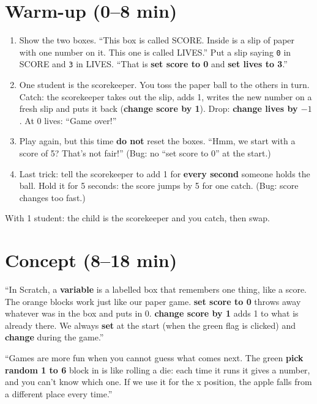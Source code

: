 \section{Warm-up (0--8 min)}
\begin{unplugged}
\begin{enumerate}[leftmargin=1.4em,itemsep=1pt]
  \item Show the two boxes. \enquote{This box is called SCORE. Inside is a slip of paper with one number on it. This one is called LIVES.} Put a slip saying \texttt{0} in SCORE and \texttt{3} in LIVES. \enquote{That is \textbf{set score to 0} and \textbf{set lives to 3}.}
  \item One student is the scorekeeper. You toss the paper ball to the others in turn. Catch: the scorekeeper takes out the slip, adds 1, writes the new number on a fresh slip and puts it back (\textbf{change score by 1}). Drop: \textbf{change lives by $-1$}. At 0 lives: \enquote{Game over!}
  \item Play again, but this time \textbf{do not} reset the boxes. \enquote{Hmm, we start with a score of 5? That's not fair!} (Bug: no \enquote{set score to 0} at the start.)
  \item Last trick: tell the scorekeeper to add 1 for \textbf{every second} someone holds the ball. Hold it for 5 seconds: the score jumps by 5 for one catch. (Bug: score changes too fast.)
\end{enumerate}
With 1 student: the child is the scorekeeper and you catch, then swap.
\end{unplugged}

\section{Concept (8--18 min)}
\begin{teacherscript}
\enquote{In Scratch, a \textbf{variable} is a labelled box that remembers one thing, like a score. The orange  blocks work just like our paper game. \textbf{set score to 0} throws away whatever was in the box and puts in 0. \textbf{change score by 1} adds 1 to what is already there. We always \textbf{set} at the start (when the green flag is clicked) and \textbf{change} during the game.}

\enquote{Games are more fun when you cannot guess what comes next. The green \textbf{pick random 1 to 6} block in  is like rolling a die: each time it runs it gives a number, and you can't know which one. If we use it for the x position, the apple falls from a different place every time.}
\end{teacherscript}

